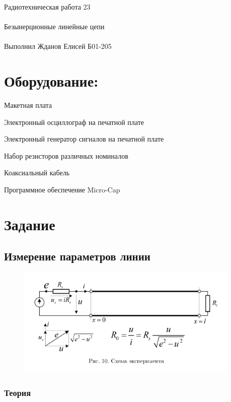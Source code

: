 \documentclass{astroedu-lab}
\begin{document}
\pagestyle{plain}

\begin{problem}{\huge Радиотехническая работа 23\\\\Безынерционные линейные цепи\\\\Выполнил Жданов Елисей Б01-205}

\section{Оборудование:}

Макетная плата

Электронный осциллограф на печатной плате

Электронный генератор сигналов на печатной плате

Набор резисторов различных номиналов

Коаксиальный кабель

Программное обеспечение Micro-Cap

\section{Задание}

\subsection{Измерение параметров линии}

\begin{figure}[!h]
	\centering
	\includegraphics[width=0.95\textwidth]{схема.png}
	\label{fig:boiler}
\end{figure}

\subsubsection{Теория}


\end{problem}
\end{document}
